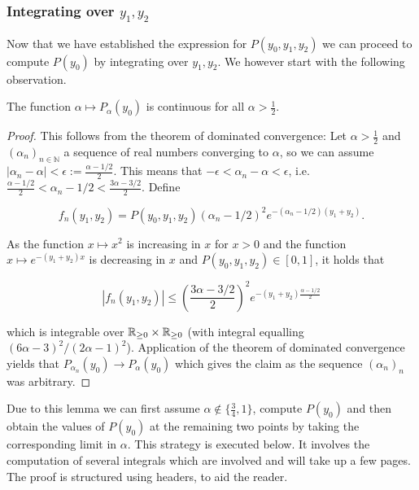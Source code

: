 %


\subsubsection{Integrating over \texorpdfstring{$y_1, y_2$}{y1, y2}}


Now that we have established the expression for $P(y_0,y_1,y_2)$ we can proceed to compute $P(y_0)$ by integrating over $y_1, y_2$.
We however start with the following observation.

\begin{lemma}\label{lem:continuity_Delta_function}
The function $\alpha \mapsto P_\alpha(y_0)$ is continuous for all $\alpha > \frac{1}{2}$.
\end{lemma}

\begin{proof}
This follows from the theorem of dominated convergence:
Let $\alpha > \frac{1}{2}$ and $(\alpha_n)_{n\in \mathbb{N}}$ a sequence of real numbers converging to $\alpha$, so we can 
assume $|\alpha_n - \alpha| < \epsilon := \frac{\alpha-1/2}{2}$. 
This means that $-\epsilon < \alpha_n - \alpha < \epsilon$, i.e. $\frac{\alpha-1/2}{2} < \alpha_n - 1/2 < \frac{3\alpha-3/2}{2}$. Define 

$$f_n(y_1,y_2) = P(y_0,y_1,y_2) (\alpha_n - 1/2)^2 e^{-(\alpha_n-1/2)(y_1+y_2)}.$$ 

As the function $x \mapsto x^2$ is increasing in $x$ for $x>0$ and the function $x \mapsto e^{-(y_1+y_2)x}$ is decreasing 
in $x$ and $P(y_0,y_1,y_2) \in [0,1]$, it holds that 

$$|f_n(y_1,y_2)| \leq \left(\frac{3\alpha-3/2}{2}\right)^2e^{-(y_1+y_2)\frac{\alpha-1/2}{2}}$$

which is integrable over ${\mathbb R}_{\geq 0} \times {\ensuremath{\mathbb R}}_{\geq 0}$ (with integral equalling $(6\alpha-3)^2/(2\alpha-1)^2$). 
Application of the theorem of dominated convergence yields that 
$P_{\alpha_n}(y_0) \rightarrow P_\alpha(y_0)$ which gives the claim as the 
sequence $(\alpha_n)_n$ was arbitrary.
\end{proof}

Due to this lemma we can first assume $\alpha \notin \{ \frac{3}{4},1 \}$, compute $P(y_0)$ and then obtain the values of $P(y_0)$ at 
the remaining two points by taking the corresponding limit in $\alpha$. 
This strategy is executed below. 
It involves the computation of several integrals which are involved and will take up a few pages. 
The proof is structured using headers, to aid the reader. 


